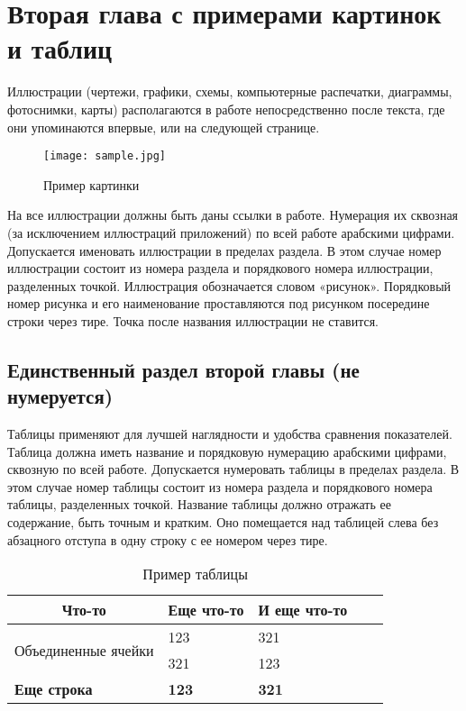 \chapter{Вторая глава с примерами картинок и таблиц}

Иллюстрации (чертежи, графики, схемы, компьютерные распечатки, диаграммы, фотоснимки, карты) располагаются в работе непосредственно после текста, где они упоминаются впервые, или на следующей странице.

\begin{figure}[htbp]
	\centering
	\texttt{[image: sample.jpg]}
	\caption{Пример картинки}
	\label{fig:figure-sample}
\end{figure}

На все иллюстрации должны быть даны ссылки в работе. Нумерация их сквозная (за исключением иллюстраций приложений) по всей работе арабскими цифрами. Допускается именовать иллюстрации в пределах раздела. В этом случае номер иллюстрации состоит из номера раздела и порядкового номера иллюстрации, разделенных точкой. Иллюстрация обозначается словом «рисунок». Порядковый номер рисунка и его наименование проставляются под рисунком посередине строки через тире. Точка после названия иллюстрации не ставится. 

\section*{Единственный раздел второй главы (не нумеруется)}

Таблицы применяют для лучшей наглядности и удобства сравнения показателей. Таблица должна иметь название и порядковую нумерацию арабскими цифрами, сквозную по всей работе. Допускается нумеровать таблицы в пределах раздела. В этом случае номер таблицы состоит из номера раздела и порядкового номера таблицы, разделенных точкой. Название таблицы должно отражать ее содержание, быть точным и кратким. Оно помещается над таблицей слева без абзацного отступа в одну строку с ее номером через тире.

\begin{longtable}{|l|l|l|ll}
	\caption{Пример таблицы}
	\label{tab:table-sample}\\
	\cline{1-3}
	\multicolumn{1}{|c|}{Что-то} & \multicolumn{1}{c|}{Еще что-то} & \multicolumn{1}{c|}{И еще что-то} &  &  \\ \cline{1-3}
	\endhead
	\multirow{2}{*}{Объединенные ячейки} & 123          & 321          &  &  \\ \cline{2-3}
	& 321          & 123          &  &  \\ \cline{1-3}
	\textbf{Еще строка}                  & \textbf{123} & \textbf{321} &  &  \\ \cline{1-3}
\end{longtable}